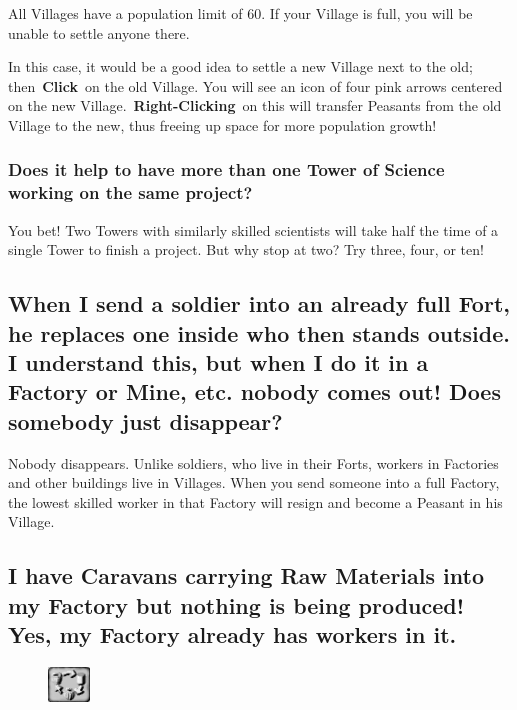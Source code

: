 All Villages have a population limit of 60. If your Village is full, you will be unable to settle anyone there.

In this case, it would be a good idea to settle a new Village next to the old; then \textbf{Click} on the old Village. You will see an icon of four pink arrows centered on the new Village. \textbf{Right-Clicking} on this will transfer Peasants from the old Village to the new, thus freeing up space for more population growth!

\subsubsection{Does it help to have more than one Tower of Science working on the same project?}

You bet! Two Towers with similarly skilled scientists will take half the time of a single Tower to finish a project. But why stop at two? Try three, four, or ten!

\subsection{When I send a soldier into an already full Fort, he replaces one inside who then stands outside. I understand this, but when I do it in a Factory or Mine, etc. nobody comes out! Does somebody just disappear?}

Nobody disappears. Unlike soldiers, who live in their Forts, workers in Factories and other buildings live in Villages. When you send someone into a full Factory, the lowest skilled worker in that Factory will resign and become a Peasant in his Village.

\subsection{I have Caravans carrying Raw Materials into my Factory but nothing is being produced! Yes, my Factory already has workers in it.}

\begin{figure}
	\vspace{-20pt}
	\begin{center}
		\includegraphics[width=0.1\textwidth]{Tgoodcycling}
	\end{center}
	\vspace{-20pt}
\end{figure}

